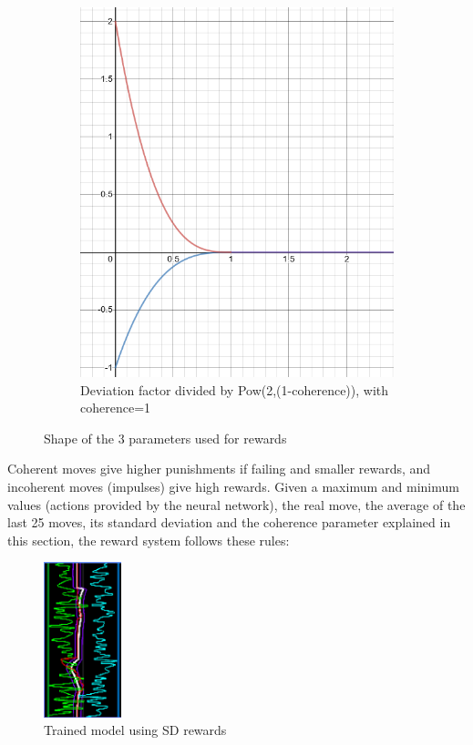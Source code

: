 \begin{figure}
\begin{subfigure}[b]{0.3\textwidth}
        \includegraphics[width=\textwidth]{img/stdDevfactor.png}
        \caption{Deviation factor divided by Pow(2,(1-coherence)), with coherence=1}
        \label{fig:devf}
    \end{subfigure}
    \caption{Shape of the 3 parameters used for rewards}
		\label{fig:stdshapes}
\end{figure}

Coherent moves give higher punishments if failing and smaller rewards, and incoherent moves (impulses) give high rewards. Given a maximum and minimum values (actions provided by the neural network), the real move, the average of the last 25 moves, its standard deviation and the coherence parameter explained in this section, the reward system follows these rules:

\begin{figure}
    \centering
    \includegraphics[width=0.2\textwidth]{img/graphsSTDrew.png}
		\caption{Trained model using SD rewards}
		\label{fig:stdrewards}
\end{figure}

